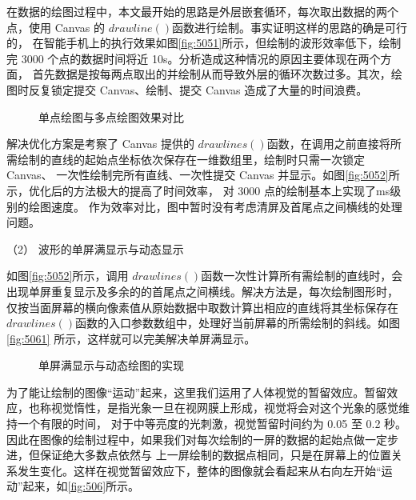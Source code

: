 在数据的绘图过程中，本文最开始的思路是外层嵌套循环，每次取出数据的两个点，使用 Canvas 的 $drawline()$函数进行绘制。事实证明这样的思路的确是可行的，
在智能手机上的执行效果如图\autoref{fig:5051}所示，但绘制的波形效率低下，绘制完 3000 个点的数据时间将近 10s。分析造成这种情况的原因主要体现在两个方面，
首先数据是按每两点取出的并绘制从而导致外层的循环次数过多。其次，绘图时反复锁定提交 Canvas、绘制、提交 Canvas 造成了大量的时间浪费。 
\begin{figure}[htbp]
    \centering
    \quad
    \caption{\label{fig:505}单点绘图与多点绘图效果对比}
\end{figure}

解决优化方案是考察了 Canvas 提供的 $drawlines()$函数，在调用之前直接将所需绘制的直线的起始点坐标依次保存在一维数组里，绘制时只需一次锁定 Canvas、
一次性绘制完所有直线、一次性提交 Canvas 并显示。如图\autoref{fig:5052}所示，优化后的方法极大的提高了时间效率， 对 3000 点的绘制基本上实现了ms级别的绘图速度。
作为效率对比，图中暂时没有考虑清屏及首尾点之间横线的处理问题。

（2）	波形的单屏满显示与动态显示 

如图\autoref{fig:5052}所示，调用 $drawlines()$函数一次性计算所有需绘制的直线时，会出现单屏重复显示及多余的的首尾点之间横线。解决方法是，每次绘制图形时，
仅按当面屏幕的横向像素值从原始数据中取数计算出相应的直线将其坐标保存在 $drawlines()$函数的入口参数数组中，处理好当前屏幕的所需绘制的斜线。如图\autoref{fig:5061}
所示，这样就可以完美解决单屏满显示。 
\begin{figure}[htbp]
    \centering
    \quad
    \caption{\label{fig:506}单屏满显示与动态绘图的实现}
\end{figure}

为了能让绘制的图像“运动”起来，这里我们运用了人体视觉的暂留效应。暂留效应，也称视觉惰性，是指光象一旦在视网膜上形成，视觉将会对这个光象的感觉维持一个有限的时间，
对于中等亮度的光刺激，视觉暂留时间约为 0.05 至 0.2 秒。因此在图像的绘制过程中，如果我们对每次绘制的一屏的数据的起始点做一定步进，但保证绝大多数点依然与
上一屏绘制的数据点相同，只是在屏幕上的位置关系发生变化。这样在视觉暂留效应下，整体的图像就会看起来从右向左开始“运动”起来，如\autoref{fig:506}所示。 

